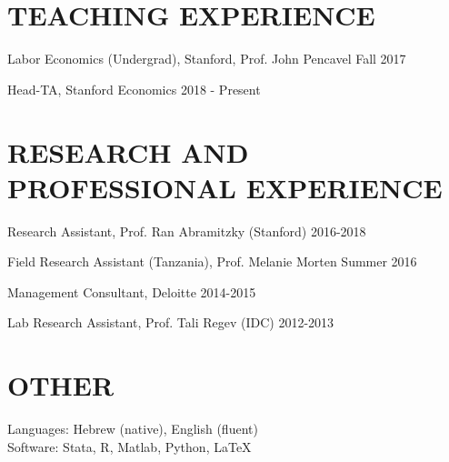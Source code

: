 \documentclass[margin]{res} %
\begin{document}
\begin{resume}
 
\section{TEACHING EXPERIENCE}

 Labor Economics (Undergrad), Stanford, Prof. John Pencavel \hfill Fall 2017

 Head-TA, Stanford Economics \hfill 2018 - Present

 
\section{RESEARCH AND PROFESSIONAL EXPERIENCE}
 Research Assistant, Prof. Ran Abramitzky (Stanford) \hfill 2016-2018

 Field Research Assistant (Tanzania), Prof. Melanie Morten \hfill Summer 2016
 
 Management Consultant, Deloitte \hfill 2014-2015 

 Lab Research Assistant, Prof. Tali Regev (IDC) \hfill 2012-2013

 \begin{comment}
\section{APPLICABLE GRADUATE COURSEWORK}

Labor Economics \hfill Spring 2017

Quantitative Methods For Empirical Work \hfill Fall 2017

Intermediate Econometrics I - III \hfill Fall 2015 - Spring 2016

Public Economics I - II \hfill  Fall 2016 - Winter 2017
\end{comment}

\section{OTHER} 
Languages: Hebrew (native), English (fluent) \\
Software: Stata, R, Matlab, Python, \LaTeX


\end{resume}
\end{document}
